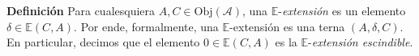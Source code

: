 \documentclass[preview]{standalone}
\begin{document}
\begin{center}
\textbf{Definición} Para cualesquiera $A,C\in\text{Obj}(\mathscr{A})$, una $\mathbb{E}$-\emph{extensión} es un elemento $\delta\in\mathbb{E}(C,A)$. Por ende, formalmente, una $\mathbb{E}$-extensión es una terna $(A,\delta,C)$. En particular, decimos que el elemento $0\in\mathbb{E}(C,A)$ es la $\mathbb{E}$-\emph{extensión escindible}.
\end{center}
\end{document}
